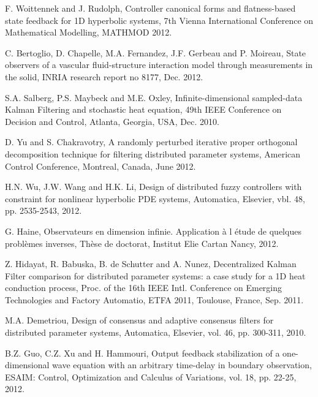 \documentclass[journal]{IEEEtran}
\begin{document}
\begin{thebibliography}{100}

 \label{WoiRud12}
F. Woittennek and J. Rudolph, Controller canonical forms and flatness-based state feedback for 1D hyperbolic systems,
7th Vienna International Conference on Mathematical Modelling, MATHMOD 2012.

 \label{BerChoFerGerMoi12}
C. Bertoglio, D. Chapelle, M.A. Fernandez, J.F. Gerbeau and P. Moireau, State observers of a vascular fluid-structure interaction model through measurements in the solid, INRIA research report no 8177, Dec. 2012.

 \label{SalMayOxl10}
S.A. Salberg, P.S. Maybeck and M.E. Oxley, Infinite-dimensional sampled-data Kalman Filtering and stochastic
heat equation, 49th IEEE Conference on Decision and Control, Atlanta, Georgia, USA, Dec. 2010.

 \label{YuCha12}
D. Yu and S. Chakravotry, A randomly perturbed iterative proper orthogonal decomposition technique for filtering distributed parameter systems, American Control Conference, Montreal, Canada, June 2012.

 \label{WuWanLi12}
H.N. Wu, J.W. Wang and H.K. Li, Design of distributed  fuzzy controllers with constraint for nonlinear hyperbolic PDE systems, Automatica, Elsevier, vbl. 48, pp. 2535-2543, 2012.

 \label{HaiRam10}
G. Haine, Observateurs en dimension infinie. Application \`{a} l \'{e}tude de quelques probl\`{e}mes inverses, Th\`{e}se de doctorat, Institut Elie Cartan Nancy, 2012.

 \label{HidBabSchuNun11}
Z. Hidayat, R. Babuska, B. de Schutter and A. Nunez, Decentralized Kalman Filter comparison for distributed parameter systems: a case study for a 1D heat conduction process, Proc. of the 16th IEEE Intl. Conference on Emerging Technologies and Factory Automatio, ETFA 2011, Toulouse, France, Sep. 2011.

 \label{Dem10}
M.A. Demetriou, Design of consensus and adaptive consensus filters for distributed parameter systems, Automatica, Elsevier, vol. 46, pp. 300-311, 2010.

 \label{GuoXuHam12}
B.Z. Guo, C.Z. Xu and H. Hammouri, Output feedback stabilization of a one-dimensional wave equation with an arbitrary
time-delay in boundary observation, ESAIM: Control, Optimization and Calculus of Variations, vol. 18, pp. 22-25, 2012.


\end{thebibliography}
\end{document}
